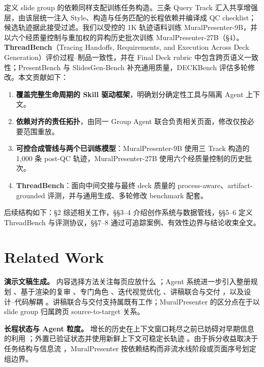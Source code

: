 

定义 slide group 的依赖同样支配训练任务构造。三条 Query Track 汇入共享增强层，由该层统一注入 Style、构造与任务匹配的长程依赖并编译成 QC checklist；候选轨迹据此接受过滤。我们以受控的 1K 轨迹语料训练 MuralPresenter-9B，并以六个经质量控制与重加权的异构历史批次训练 MuralPresenter-27B（§4）。\textbf{ThreadBench}（Tracing Handoffs, Requirements, and Execution Across Deck Generation）评价过程–制品一致性，并在 Final Deck rubric 中包含跨页语义一致性；PresentBench 与 SlidesGen-Bench 补充通用质量，DECKBench 评估多轮修改。本文贡献如下：

\begin{enumerate}
\item \textbf{覆盖完整生命周期的 Skill 驱动框架}，明确划分确定性工具与隔离 Agent 上下文。
\item \textbf{依赖对齐的责任拓扑}，由同一 Group Agent 联合负责相关页面，修改仅按必要范围重放。
\item \textbf{可控合成管线与两个已训练模型}：MuralPresenter-9B 使用三 Track 构造的 1,000 条 post-QC 轨迹，MuralPresenter-27B 使用六个经质量控制的历史批次。
\item \textbf{ThreadBench}：面向中间交接与最终 deck 质量的 process-aware、artifact-grounded 评测，并与通用生成、多轮修改 benchmark 配套。
\end{enumerate}

后续结构如下：§2 综述相关工作，§§3–4 介绍创作系统与数据管线，§§5–6 定义 ThreadBench 与评测协议，§§7–8 通过可追踪案例、有效性边界与结论收束全文。

\section{Related Work}

\textbf{演示文稿生成。} 内容选择方法关注每页应放什么 \citep{bandyopadhyay-etal-2024-enhancing-presentation,maheshwari-etal-2024-presentations}；Agent 系统进一步引入整册规划 \citep{zheng2025pptagent}、基于渲染的复审 \citep{xu-etal-2025-pregenie}、专门角色 \citep{xie2026slidebot}、迭代视觉优化 \citep{zheng2026deeppresenter}、讲稿联合与交付 \citep{yang2026deepslide}，以及设计–代码解耦 \citep{cui2026designfirst}。讲稿联合与交付支持属既有工作；MuralPresenter 的区分点在于以 slide group 归属跨页 source-to-target 关系。

\textbf{长程状态与 Agent 粒度。} 增长的历史在上下文窗口耗尽之前已妨碍对早期信息的利用 \citep{sun2025contextfolding}；外置已验证状态并使用新鲜上下文可稳定长轨迹 \citep{ma2026longhorizonharness}。由于拆分收益取决于任务结构与信息流 \citep{kim2025scalingagents}，MuralPresenter 按依赖结构而非流水线阶段或页面序号划定组边界。

